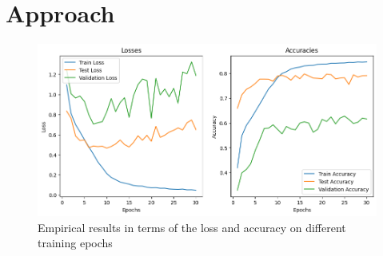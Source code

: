 


\section{Approach}
\label{sec:approach}

\begin{figure}[ht]
  \centering
   \includegraphics[width=\linewidth]{output.png}
   \caption{Empirical results in terms of the loss and accuracy on different training epochs}
   \label{fig:result}
\end{figure}


